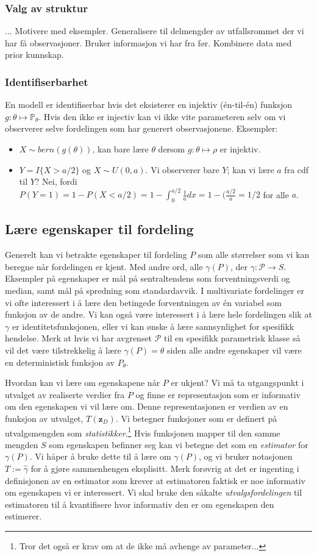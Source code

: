 \subsubsection{Valg av struktur}
... Motivere med eksempler. Generalisere til delmengder av utfallsrommet der vi har få observasjoner. Bruker informasjon vi har fra før. Kombinere data med prior kunnskap.
\subsubsection{Identifiserbarhet}
En modell er identifiserbar hvis det eksisterer en injektiv (én-til-én) funksjon $g:\theta \mapsto \mathbb{P}_{\theta}$. Hvis den ikke er injectiv kan vi ikke vite parameteren selv om vi observerer selve fordelingen som har generert observasjonene. Eksempler:
\begin{itemize}
\item $X \sim bern(g(\theta))$, kan bare lære $\theta$ dersom $g:\theta \mapsto \rho$ er injektiv.
\item $Y = I\{X>a/2\}$ og $X\sim U(0,a)$. Vi observerer bare $Y$; kan vi lære $a$ fra cdf til $Y$? Nei, fordi $P(Y=1) = 1 - P(X<a/2) = 1 - \int_0^{a/2}\frac{1}{a}dx = 1-(\frac{a/2}{a} = 1/2$ for alle $a$.
\end{itemize}
\subsection{Lære egenskaper til fordeling}
Generelt kan vi betrakte egenskaper til fordeling $P$ som alle størrelser som vi kan beregne når fordelingen er kjent. Med andre ord, alle $\gamma (P)$, der $\gamma : \mathcal{P} \rightarrow S$. Eksempler på egenskaper er mål på sentraltendens som forventningsverdi og median, samt mål på spredning som standardavvik. I multivariate fordelinger er vi ofte interessert i å lære den betingede forventningen av én variabel som funksjon av de andre. Vi kan også være interessert i å lære hele fordelingen slik at $\gamma$ er identitetsfunksjonen, eller vi kan ønske å lære sannsynlighet for spesifikk hendelse. Merk at hvis vi har avgrenset $\mathcal{P}$ til en spesifikk parametrisk klasse så vil det være tilstrekkelig å lære $\gamma(P) = \theta$ siden alle andre egenskaper vil være en deterministisk funksjon av $P_{\theta}$.

Hvordan kan vi lære om egenskapene når $P$ er ukjent? Vi må ta utgangspunkt i utvalget av realiserte verdier fra $P$ og finne er representasjon som er informativ om den egenskapen vi vil lære om. Denne representasjonen er verdien av en funksjon av utvalget, $T(\mathbf{z}_D)$. Vi betegner funksjoner som er definert på utvalgsmengden som \textit{statistikker}.\footnote{Tror det også er krav om at de ikke må avhenge av parameter...} Hvis funksjonen mapper til den samme mengden $S$ som egenskapen befinner seg kan vi betegne det som en \textit{estimator} for $\gamma(P)$. Vi håper å bruke dette til å lære om $\gamma(P)$, og vi bruker notasjonen $T:=\hat{\gamma}$ for å gjøre sammenhengen eksplisitt. Merk forøvrig at det er ingenting i definisjonen av en estimator som krever at estimatoren faktisk er noe informativ om egenskapen vi er interessert. Vi skal bruke den såkalte \textit{utvalgsfordelingen} til estimatoren til å kvantifisere hvor informativ den er om egenskapen den estimerer. 
